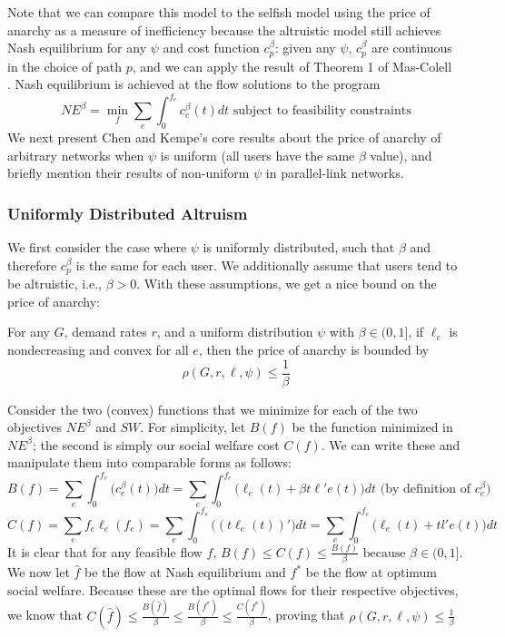 Note that we can compare this model to the selfish model using the price of anarchy as a measure of inefficiency
because the altruistic model still achieves Nash equilibrium for any $\psi$ and cost function $c^\beta_p$: given any $\psi$, $c^\beta_p$ are continuous in the choice of path $p$, and we can apply the result of Theorem 1 of Mas-Colell~\cite{mascolell} . Nash equilibrium is achieved at the flow solutions to the program
$$NE^\beta = \min_f\sum_e\int_0^{f_e}c_e^\beta(t)dt \text{ subject to feasibility constraints}$$
We next present Chen and Kempe's core results about the price of anarchy of arbitrary networks when $\psi$ is uniform (all users have the same $\beta$ value), and briefly mention their results of non-uniform $\psi$ in parallel-link networks.

\subsubsection{Uniformly Distributed Altruism}
We first consider the case where $\psi$ is uniformly distributed, such that $\beta$ and therefore $c^\beta_p$ is the same for each user. We additionally assume that users tend to be altruistic, i.e., $\beta > 0$.
With these assumptions, we get a nice bound on the price of anarchy:
\begin{theorem}
For any $G$, demand rates $r$, and 
a uniform distribution $\psi$ with $\beta \in (0, 1]$,
if $\ell_e$ is nondecreasing and convex for all $e$, then the price of anarchy is bounded by 
    $$\rho(G,r,\ell,\psi) \le \frac{1}{\beta}$$
\end{theorem}

\begin{proof-sketch}
    Consider the two (convex) functions that we minimize for each of the two objectives $NE^\beta$ and $SW$. For simplicity, let $B(f)$ be the function minimized in $NE^\beta$; the second is simply our social welfare cost $C(f)$.
    We can write these and manipulate them into comparable forms as follows:
    $$B(f) = \sum_e\int_0^{{f}_e}\Big(c_e^\beta(t)\Big)dt = 
        \sum_e\int_0^{{f}_e} \Big(\ell_e(t) + \beta t\ell'e(t)\Big)dt\text{ (by definition of $c^\beta_e$)}$$
    $$C(f) = \sum_ef_e\ell_e(f_e) = \sum_e\int_0^{f_e} \Big((t\ell_e(t))' \Big)dt 
        = \sum_e\int_0^{f_e} \Big(\ell_e(t) + tl'e(t)\Big)dt$$ 
    It is clear that for any feasible flow $f$, 
    $B(f) \le C(f) \le \frac{B(f)}{\beta} \text{ because $\beta\in(0,1]$}$.
    We now let $\hat{f}$ be the flow at Nash equilibrium and $f^*$ be the flow at optimum social welfare. Because these are the optimal flows for their respective objectives, we know that 
    $C(\hat{f}) \le \frac{B(\hat{f})}{\beta} \le \frac{B(f^*)}{\beta} \le \frac{C(f^*)}{\beta}$,
    proving that 
    $\rho(G,r,\ell,\psi) \le \frac{1}{\beta}$
\end{proof-sketch}

